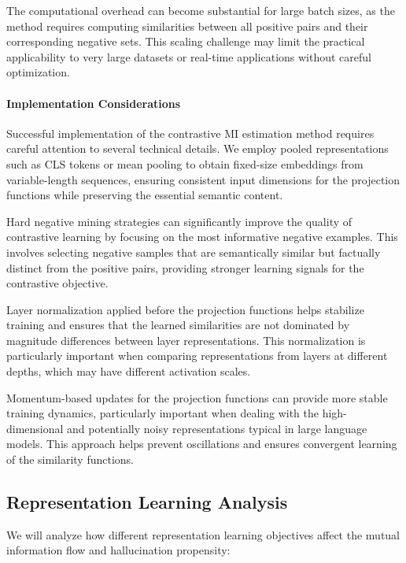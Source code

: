 The computational overhead can become substantial for large batch sizes, as the method requires computing similarities between all positive pairs and their corresponding negative sets. This scaling challenge may limit the practical applicability to very large datasets or real-time applications without careful optimization.

\paragraph{Implementation Considerations}

Successful implementation of the contrastive MI estimation method requires careful attention to several technical details. We employ pooled representations such as CLS tokens or mean pooling to obtain fixed-size embeddings from variable-length sequences, ensuring consistent input dimensions for the projection functions while preserving the essential semantic content.

Hard negative mining strategies can significantly improve the quality of contrastive learning by focusing on the most informative negative examples. This involves selecting negative samples that are semantically similar but factually distinct from the positive pairs, providing stronger learning signals for the contrastive objective.

Layer normalization applied before the projection functions helps stabilize training and ensures that the learned similarities are not dominated by magnitude differences between layer representations. This normalization is particularly important when comparing representations from layers at different depths, which may have different activation scales.

Momentum-based updates for the projection functions can provide more stable training dynamics, particularly important when dealing with the high-dimensional and potentially noisy representations typical in large language models. This approach helps prevent oscillations and ensures convergent learning of the similarity functions.

\subsection{Representation Learning Analysis}
\label{subsec:repr_analysis}

We will analyze how different representation learning objectives affect the mutual information flow and hallucination propensity:


